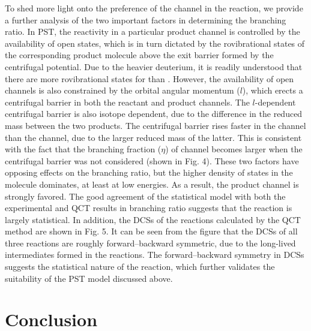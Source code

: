 To shed more light onto the preference of the  channel in the  reaction, we provide a further analysis of the two important factors in determining the branching ratio. In PST, the reactivity in a particular product channel is controlled by the availability of open states, which is in turn dictated by the rovibrational states of the corresponding product molecule above the exit barrier formed by the centrifugal potential. Due to the heavier deuterium, it is readily understood that there are more rovibrational states for  than . However, the availability of open channels is also constrained by the orbital angular momentum ($l$), which erects a centrifugal barrier in both the reactant and product channels. The $l$-dependent centrifugal barrier is also isotope dependent, due to the difference in the reduced mass between the two products. The centrifugal barrier rises faster in the  channel than the  channel, due to the larger reduced mass of the latter. This is consistent with the fact that the branching fraction ($\eta$) of  channel becomes larger when the centrifugal barrier was not considered (shown in Fig. 4). These two factors have opposing effects on the branching ratio, but the higher density of states in the  molecule dominates, at least at low energies. As a result, the  product channel is strongly favored. The good agreement of the statistical model with both the experimental and QCT results in branching ratio suggests that the reaction is largely statistical. In addition, the DCSs of the  reactions calculated by the QCT method are shown in Fig. 5. It can be seen from the figure that the DCSs of all three reactions are roughly forward–backward symmetric, due to the long-lived intermediates formed in the reactions. The forward–backward symmetry in DCSs suggests the statistical nature of the reaction, which further validates the suitability of the PST model discussed above.

\section{Conclusion}

